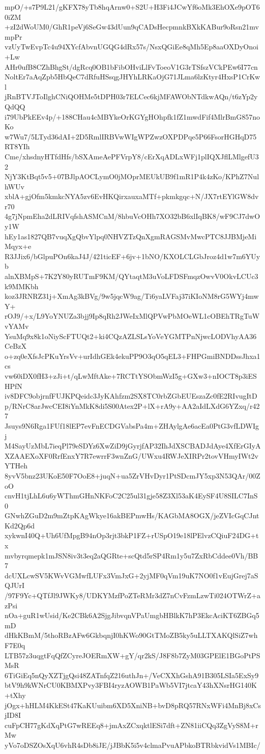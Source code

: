 mpO/+s7P9L21/gKFX78yTb8hqArnw0+S2U+H3Fi4JCwYf6oMk3EhOXe9pOT60iZM
+zI2dWoUM0/GhR1peVj6SeGw43dUun9qCADsHecpmnkBXkKABur9oRsn21mvmpPr
vzUyTwEvpTc4u94XYcfAbvnUGQG4dRx57s/NsxQGiEe8qMh5Ep8aaOXDyOnoi+Lw
AHr0ufB8CZhBhgSt/dgRcq0OB1bFibOHviLlFvToeoV1G3rTSfszVCkPEw6I77cn
NoltEr7aAqZpb5HbQeC7dRfuHSsqgJHYhLRKaOjG71JLma6lzKtyr4HxsP1CrKwl
jRnBTVJToIlghCNiQOHMe5tDPH03r7ELCec6kjMFAWObNTdkwAQn/t6zYp2yQdQQ
i79UbPkEEv4p/+188CHau4cMBYkeOrKGYgHOhpfk1fZ1mwdFif4MlrBmG857noKo
w7Wu7/5LTyd36dAI+2D5RmlIRBVwWIgWPZwzOXPDPqe5P66FsorHGHqD75RT8YIh
Cme/xhsdnyHTfdHfs/bSXAmeAePFVrpY8/cErXqADLxWFj1plIQXJflLMlgefU32
NjY3KtBqt5v5+07BJlpAOCLymO0jMOprMEUkUB9f1mR1P4k4zKo/KPhZ7NulhWUv
xblA+gjOfm5kmkcNYA5zv6EvHKQirxauxaMTf+pkmkgqc+N/JX7rtEYlGW8dvr70
4g7jNpmEha2dLRIVqfshASMCnM/8hbuVcOHh7XO32bB6xlIqBK8/wF9CJ7dwOy1W
hEy1as1827QB7vuqXgQbvYlpq0NHVZTzQnXgmRAGSMvMwcPTC8JJBMjeMiMqyx+e
R3JJix6/bGlpuPOn6kaJ4J/421ticEF+6jv+1bNO/KXOLCLGbJroz4d1w7m6YUyb
alnXBMpS+7K2Y80yRUTmF9KM/QYtaqtM3uVoLFDSFmqzOwvV0OkvLCUc3k9MMKbh
koz3JRNRZ31j+XmAg3kBVg/9w5jqcW9ag/Ti6yaLVFaj37iKIoNM8rG5WYj4mwY+
rOJ9/+x/L9YoYNUZa3bjj9Ip8qRh2JWeIxMlQPVwPbMOeWL1cOBEhTRgTuWvYAMv
YsuMq9x8k1oNiyScFTUQt2+ki4CQzAZLSLsYoVeYGMTPnNjwcLODVhyAA36CeBzX
o+zq0eXfsJcPKuYrsVv+urIdhGEk4ekuPP9O3qO5qEL3+FHPGmiBNDDssJhxa1cs
vw60iDX0fH3+zJi+t/qLwMftAke+7RCTtYSObmWzI5g+GXw3+nIOCT8p3iESHPfN
iv8DFC9objrnfFUJKPQeidc3JyKAhfzm2SX8TC0rbZGbEUEszaZc0fE2RIvugItD
p/RNrC8arJwcCEI8iYnMkK8di5S00Atex2P+lX+rA9y+AA2aIdLXdG6YZxq/r427
Jsuys9N6Rga1FUf18lEP7evFnECDGVabsPa4m+ZHAylgAe6acEa0PtG3vfLDWIgj
M4SayUzMbL7ieqPl79eSDYz6XwZiD9jGyrjfAP32IhJdXSCBADJdAye4XfErGIyA
XZAAEXoXF0RrfEnxY7R7ewrrF3wnZnG/UWxu4RWJeXIRPr2tovVHmyIWt2vYTHeh
8yvV5bnz23UKoE50F7OoE8+juqN+ua5ZrVHvDyr1PtSDcmJY5xp3N53QAr/00ZoO
cnvH1tjLhL6u6yWThmGHnNKFoC2C25ul31gje58Z3Xl53aK4EySF4U8SILC7InS0
GNwhZGuD2m9mZtpKAgWkye16akBEPmwHs/KAGbMA8OGX/jeZVIcGqCJntKd2Qp6d
xykwnI40Q+Uh6UfMpgB94nOp3rjt3bkP1FZ+rUSpO19e18lPElvzCQiuF24DG+tx
mvbyrqmepk1mJSN8iv3t3eq2aQGRte+scQtd5rSP4Rm1y5u7ZxRbCddee0Vh/BB7
dcUXLcwSV5KWvVGMwfLUFx3VmJxG+2yjMF0qVm19uK7NO0f1vEujGrej7aSQJUrI
/97F9Yc+QTfJl9JWKy8/UDKYMzfPoZTeRMr3dZ7nCvFzmLzwTi024OTWrZ+azPsi
nOa+guR1wUsid/Ke2CBk6A2SjgJibvqnVPaUmgbHBlkK7hP3EkcAciKT6ZBGq5mD
dHkKBmM/5thoRBzAFw6GkbqnjI0hKWo90GtTMoZB5ky5uLLTXAKQlSiZ7whF7E0q
LTB57z3uqgtFqQfZCyreJOERmXW+gY/qr2kS/J8F8b7ZyM03GPElE1BGoPtPSMsR
6TiGiEq5nQyXZTjgQsi48ZATnfqZ216uthJn+/VeCXXhGshA91B305LSIa5ExSy9
btV9h9kWNrCU0KBMXPvy3FBI4ryzAOWB1PaWb5VI7jtcaY43hXNsrHG140K+tXhy
jOgx+hHLM4KkESt47KaKUuibm6XD5XniNB+bvD8pRQ57RNxWFi4MnBj8xCsjID8I
cuFpCH77gKdXqPtG7wREEq8+jmAxZCxqktlESi7dft+ZN81iiCQq3ZgVyS8M+rMw
yVo7oDSZOsXqU6vhR4sDb8iJE/jJBbK5i5v4clmaPvuAPbkoBTRbkvidVs1MBIc/
